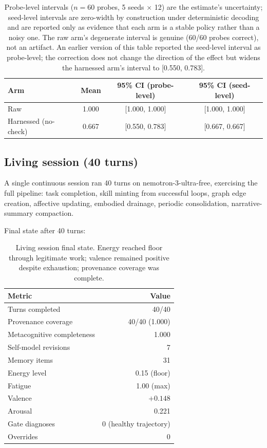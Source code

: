 \documentclass[11pt]{article}
\begin{document}
\begin{table}[h]
\centering
\begin{tabular}{lccc}
\toprule
Arm & Mean & 95\% CI (probe-level) & 95\% CI (seed-level) \\
\midrule
Raw & 1.000 & [1.000, 1.000] & [1.000, 1.000] \\
Harnessed (no-check) & 0.667 & [0.550, 0.783] & [0.667, 0.667] \\
\bottomrule
\end{tabular}
\caption{Probe-level intervals ($n=60$ probes, 5 seeds $\times$ 12) are the
estimate's uncertainty; seed-level intervals are zero-width by construction
under deterministic decoding and are reported only as evidence that each arm
is a stable policy rather than a noisy one. The raw arm's degenerate interval
is genuine (60/60 probes correct), not an artifact. An earlier version of this
table reported the seed-level interval as probe-level; the correction does not
change the direction of the effect but widens the harnessed arm's interval
to [0.550, 0.783].}
\end{table}

\subsection{Living session (40 turns)}\label{sec:living}

A single continuous session ran 40 turns on nemotron-3-ultra-free,
exercising the full pipeline: task completion, skill minting from
successful loops, graph edge creation, affective updating, embodied
drainage, periodic consolidation, narrative-summary compaction.

Final state after 40 turns:
\begin{table}[h]
\centering
\begin{tabular}{lr}
\toprule
Metric & Value \\
\midrule
Turns completed & 40/40 \\
Provenance coverage & 40/40 (1.000) \\
Metacognitive completeness & 1.000 \\
Self-model revisions & 7 \\
Memory items & 31 \\
Energy level & 0.15 (floor) \\
Fatigue & 1.00 (max) \\
Valence & $+0.148$ \\
Arousal & 0.221 \\
Gate diagnoses & 0 (healthy trajectory) \\
Overrides & 0 \\
\bottomrule
\end{tabular}
\caption{Living session final state. Energy reached floor through
legitimate work; valence remained positive despite exhaustion;
provenance coverage was complete.}
\end{table}
\end{document}

